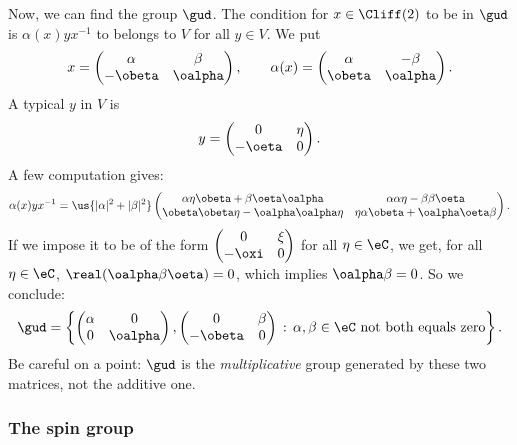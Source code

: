 Now, we can find the group $\gud$. The condition for $x\in\Cliff(2)$ to be in $\gud$ is $\alpha(x)yx^{-1}$ to belongs to $V$ for all $y\in V$. We put
\[ x=\begin{pmatrix}
		\alpha  & \beta   \\
		-\obeta & \oalpha
	\end{pmatrix},\qquad\alpha(x)=\begin{pmatrix}
		\alpha & -\beta  \\
		\obeta & \oalpha
	\end{pmatrix}.\]
A typical $y$ in $V$ is
\[
	y=\begin{pmatrix}
		0      & \eta \\
		-\oeta & 0
	\end{pmatrix}.
\]
A few computation gives:
\[
	\alpha(x)yx^{-1}=\us{|\alpha|^2+|\beta|^2}\begin{pmatrix}
		\alpha\eta\obeta+\beta\oeta\oalpha  & \alpha\alpha\eta-\beta\beta\oeta   \\
		\obeta\obeta\eta-\oalpha\oalpha\eta & \eta\alpha\obeta+\oalpha\oeta\beta
	\end{pmatrix}.
\]
If we impose it to be of the form $\begin{pmatrix}
		0     & \xi \\
		-\oxi & 0
	\end{pmatrix} $ for all $\eta\in\eC$, we get, for all $\eta\in\eC$,
$\real(\oalpha\beta\oeta)=0$, which implies $\oalpha\beta=0$. So we conclude:
\[
	\gud=\left\{\begin{pmatrix}
		\alpha & 0       \\
		0      & \oalpha
	\end{pmatrix}, \begin{pmatrix}
		0       & \beta \\
		-\obeta & 0
	\end{pmatrix}\,:\,\alpha,\beta\in\eC\textrm{ not both equals zero}\right\}.
\]
Be careful on a point: $\gud$ is the \emph{multiplicative} group generated by these two matrices, not the additive one.

\subsubsection{The spin group}

